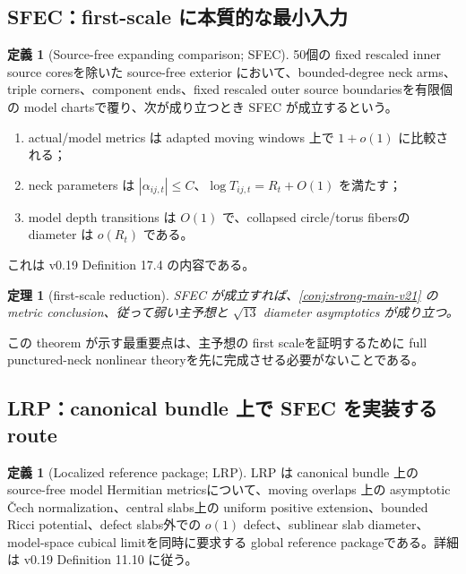 \documentclass[11pt,a4paper]{ltjsarticle}
\theoremstyle{plain}
\newtheorem{theorem}[conjecture]{定理}
\theoremstyle{definition}
\newtheorem{definition}[conjecture]{定義}
\theoremstyle{remark}
\begin{document}
\subsection{SFEC：first-scale に本質的な最小入力}

\begin{definition}[Source-free expanding comparison; SFEC]\label{def:sfec-v21}
50個の fixed rescaled inner source coresを除いた source-free exterior において、bounded-degree neck arms、triple corners、component ends、fixed rescaled outer source boundariesを有限個の model chartsで覆り、次が成り立つとき SFEC が成立するという。
\begin{enumerate}[label=(SF\arabic*)]
\item actual/model metrics は adapted moving windows 上で $1+o(1)$ に比較される；
\item neck parameters は $|\alpha_{ij,t}|\le C$、$\log T_{ij,t}=R_t+O(1)$ を満たす；
\item model depth transitions は $O(1)$ で、collapsed circle/torus fibersの diameter は $o(R_t)$ である。
\end{enumerate}
これは v0.19 Definition 17.4 の内容である。
\end{definition}

\begin{theorem}[first-scale reduction]\label{thm:sfec-main-v21}
SFEC が成立すれば、\cref{conj:strong-main-v21} の metric conclusion、従って弱い主予想と $\sqrt{13}$ diameter asymptotics が成り立つ。
\end{theorem}

この theorem が示す最重要点は、主予想の first scaleを証明するために full punctured-neck nonlinear theoryを先に完成させる必要がないことである。

\subsection{LRP：canonical bundle 上で SFEC を実装する route}

\begin{definition}[Localized reference package; LRP]\label{def:lrp-v21}
LRP は canonical bundle 上の source-free model Hermitian metricsについて、moving overlaps 上の asymptotic Čech normalization、central slabs上の uniform positive extension、bounded Ricci potential、defect slabs外での $o(1)$ defect、sublinear slab diameter、model-space cubical limitを同時に要求する global reference packageである。詳細は v0.19 Definition 11.10 に従う。
\end{definition}
\end{document}
